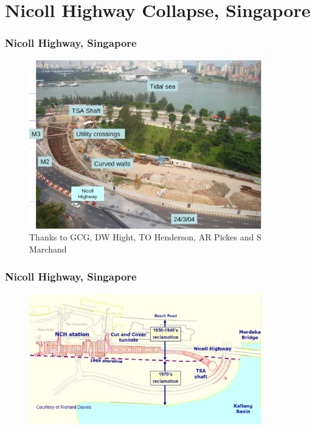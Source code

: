 \documentclass[notes]{beamer}
\begin{document}
\section{Nicoll Highway Collapse, Singapore}
\begin{frame}
\frametitle{Nicoll Highway, Singapore}
\begin{figure}[ht]
	\centering
	\includegraphics[width=0.9\textwidth]{figs/nicoll-highway.png}
	\caption{Thanks to GCG, DW Hight, TO Henderson, AR Pickes and S Marchand }
\end{figure}
\end{frame}

\begin{frame}
\frametitle{Nicoll Highway, Singapore}
\begin{figure}[ht]
	\centering
	\includegraphics[width=0.9\textwidth]{figs/nicoll-plan-view.png}
\end{figure}
\end{frame}
	
\end{document}

